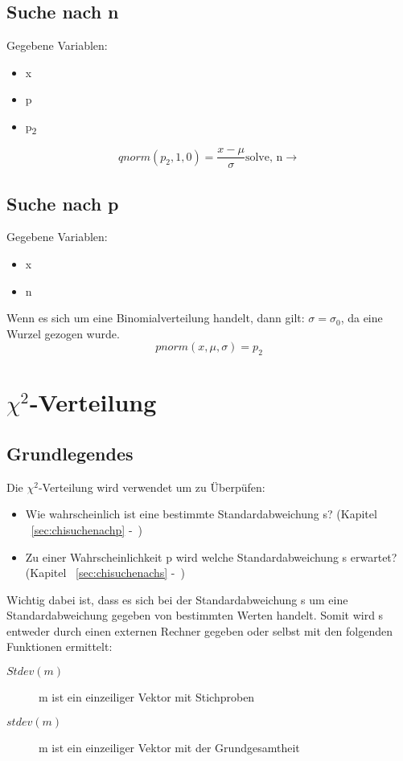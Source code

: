 \documentclass[a4paper,10pt]{article}
\begin{document}
\subsection{Suche nach n}
Gegebene Variablen:
\begin{itemize}
\item x
\item p
\item p\textsubscript{2}
\end{itemize}
\begin{equation}
  qnorm(p_2, 1, 0) = \frac{x -\mu}{\sigma} \text{solve, n} \rightarrow
\end{equation}

\subsection{Suche nach p}
Gegebene Variablen:
\begin{itemize}
\item x
\item n
\end{itemize}
Wenn es sich um eine Binomialverteilung handelt, dann gilt: $ \sigma =
\sigma_0 $, da eine Wurzel gezogen wurde.
\begin{equation}
  pnorm(x, \mu, \sigma) = p_2
\end{equation}

\section{$ \chi ^2 $-Verteilung}
\subsection{Grundlegendes}
\label{sec:chiquadratverteilunggrundlegendes}
Die $ \chi ^2 $-Verteilung wird verwendet um zu Überpüfen:
\begin{itemize}
\item Wie wahrscheinlich ist eine bestimmte Standardabweichung s?
  (Kapitel ~\autoref{sec:chisuchenachp} -~)
\item Zu einer Wahrscheinlichkeit p wird welche Standardabweichung s
  erwartet? (Kapitel ~\autoref{sec:chisuchenachs}
  -~)
\end{itemize}

Wichtig dabei ist, dass es sich bei der Standardabweichung s um eine
Standardabweichung gegeben von bestimmten Werten handelt. Somit wird s
entweder durch einen externen Rechner gegeben oder selbst mit den
folgenden Funktionen ermittelt:
\begin{description}
\item[$ Stdev(m) $] m ist ein einzeiliger Vektor mit Stichproben
\item[$ stdev(m) $] m ist ein einzeiliger Vektor mit der Grundgesamtheit
\end{description}
\end{document}
